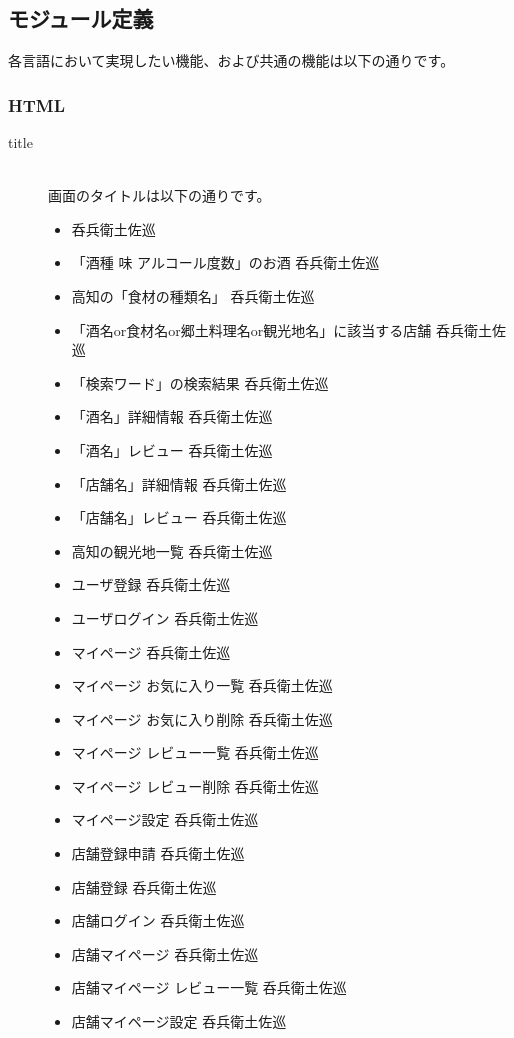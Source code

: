 \documentclass[a4j,titlepage]{jarticle}
\begin{document}
\subsection{モジュール定義}
 各言語において実現したい機能、および共通の機能は以下の通りです。

\subsubsection{HTML}
\begin{description}
\item [title]~\\
画面のタイトルは以下の通りです。

\begin{itemize}
\item 呑兵衛土佐巡
\item 「酒種 味 アルコール度数」のお酒 呑兵衛土佐巡
\item 高知の「食材の種類名」 呑兵衛土佐巡
\item 「酒名or食材名or郷土料理名or観光地名」に該当する店舗 呑兵衛土佐巡
\item 「検索ワード」の検索結果 呑兵衛土佐巡
\item 「酒名」詳細情報 呑兵衛土佐巡
\item 「酒名」レビュー 呑兵衛土佐巡
\item 「店舗名」詳細情報 呑兵衛土佐巡
\item 「店舗名」レビュー 呑兵衛土佐巡
\item 高知の観光地一覧 呑兵衛土佐巡
\item ユーザ登録 呑兵衛土佐巡
\item ユーザログイン 呑兵衛土佐巡
\item マイページ 呑兵衛土佐巡
\item マイページ お気に入り一覧 呑兵衛土佐巡
\item マイページ お気に入り削除 呑兵衛土佐巡
\item マイページ レビュー一覧 呑兵衛土佐巡
\item マイページ レビュー削除 呑兵衛土佐巡
\item マイページ設定 呑兵衛土佐巡
\item 店舗登録申請 呑兵衛土佐巡
\item 店舗登録 呑兵衛土佐巡
\item 店舗ログイン 呑兵衛土佐巡
\item 店舗マイページ 呑兵衛土佐巡
\item 店舗マイページ レビュー一覧 呑兵衛土佐巡
\item 店舗マイページ設定 呑兵衛土佐巡
\end{itemize}


\end{description}
\end{document}
